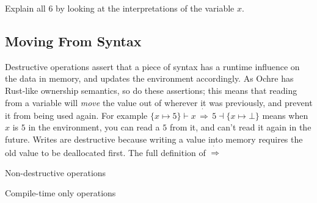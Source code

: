 \documentclass[12pt,twoside]{report}
\begin{document}
Explain all 6 by looking at the interpretations of the variable $x$.

\subsection{Moving From Syntax}
Destructive operations assert that a piece of syntax has a runtime influence on the data in memory, and updates the environment accordingly. As Ochre has Rust-like ownership semantics, so do these assertions; this means that reading from a variable will \textit{move} the value out of wherever it was previously, and prevent it from being used again. For example $\{x \mapsto 5\} \vdash x\,\dot{\Rightarrow}\,5 \dashv \{x \mapsto \bot\}$ means when $x$ is $5$ in the environment, you can read a $5$ from it, and can't read it again in the future. Writes are destructive because writing a value into memory requires the old value to be deallocated first. The full definition of $\dot{\Rightarrow}$

Non-destructive operations

Compile-time only operations
\end{document}
